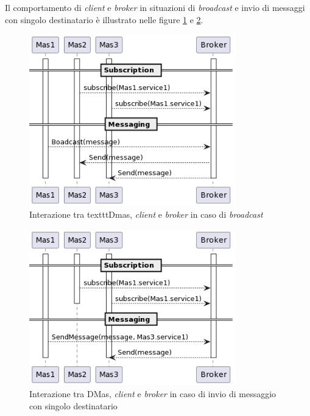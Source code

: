 Il comportamento di \textit{client} e \textit{broker} in situazioni di \textit{broadcast} e invio di messaggi con singolo destinatario è illustrato nelle figure \ref{fig:interaction-broadcast} e \ref{fig:interaction-sendmessage}.

\begin{figure}[ht!]
    \centering
    \includegraphics[width=0.8\textwidth]{figures/interaction-broadcast.png}
    \caption{Interazione tra texttt{Dmas}, \textit{client} e \textit{broker} in caso di \textit{broadcast}}
    \label{fig:interaction-broadcast}
\end{figure}

\begin{figure}[ht!]
    \centering
    \includegraphics[width=0.8\textwidth]{figures/interaction-sendmessage.png}
    \caption{Interazione tra DMas, \textit{client} e \textit{broker} in caso di invio di messaggio con singolo destinatario}
    \label{fig:interaction-sendmessage}
\end{figure}

